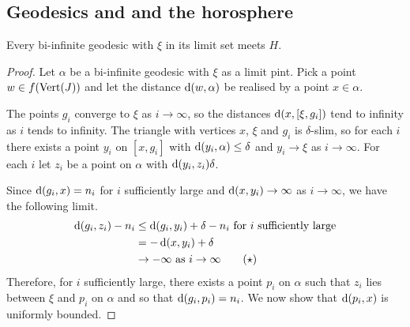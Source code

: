\documentclass[a4paper]{article}
\begin{document}
\subsection{Geodesics and and the horosphere}

\begin{lemma}\label{lem:geodesicsmeethorosphere}
  Every bi-infinite geodesic with $\xi$ in its limit set meets $H$.
\end{lemma}

\begin{proof}
  Let $\alpha$ be a bi-infinite geodesic with $\xi$ as a limit pint. Pick a
  point $w \in f(\operatorname{Vert}(J))$ and let the distance $\operatorname{d}(w,\alpha)$ be
  realised by a point $x \in \alpha$.

  The points $g_i$ converge to $\xi$ as $i\to\infty$, so the distances
  $\operatorname{d}(x, [\xi, g_i])$ tend to infinity as $i$ tends to infinity. The
  triangle with vertices $x$, $\xi$ and $g_i$ is $\delta$-slim, so for each $i$
  there exists a point $y_i$ on $[x, g_i]$ with $\operatorname{d}(y_i, \alpha) \leq
  \delta$ and $y_i\to\xi$ as $i\to\infty$.  For each $i$ let $z_i$ be a point
  on $\alpha$ with $\operatorname{d}(y_i, z_i) \delta$.

  Since $\operatorname{d}(g_i, x) = n_i$ for $i$ sufficiently large and $\operatorname{d}(x,y_i) \to
  \infty$ as $i\to\infty$, we have the following limit.
  \begin{align*}\label{eqn:zi_closer_to_gi_than_x}
    \operatorname{d}(g_i,z_i) - n_i &\leq \operatorname{d}(g_i,y_i) + \delta - n_i \text{ for $i$
                                        sufficiently large} \\
                         &= - \operatorname{d}(x,y_i) + \delta \\
                         &\to -\infty\text{ as $i \to \infty$} \tag{$\star$}
  \end{align*}
  Therefore, for $i$ sufficiently large, there exists a point $p_i$ on $\alpha$
  such that $z_i$ lies between $\xi$ and $p_i$ on $\alpha$ and so that
  $\operatorname{d}(g_i,p_i)=n_i$. We now show that $\operatorname{d}(p_i, x)$ is uniformly bounded.


\end{proof}
\end{document}
